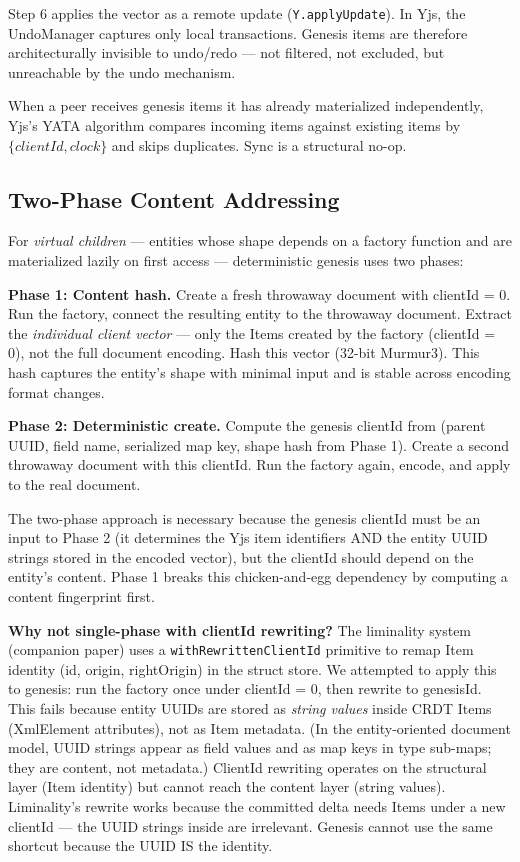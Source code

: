 Step 6 applies the vector as a remote update (\texttt{Y.applyUpdate}). In Yjs, the UndoManager captures only local transactions\cite{yata2016}. Genesis items are therefore architecturally invisible to undo/redo --- not filtered, not excluded, but unreachable by the undo mechanism.

When a peer receives genesis items it has already materialized independently, Yjs's YATA algorithm\cite{yata2016} compares incoming items against existing items by $\{\mathit{clientId}, \mathit{clock}\}$ and skips duplicates. Sync is a structural no-op.

\subsection{Two-Phase Content Addressing}

For \emph{virtual children} --- entities whose shape depends on a factory function and are materialized lazily on first access --- deterministic genesis uses two phases:

\textbf{Phase 1: Content hash.} Create a fresh throwaway document with clientId = 0. Run the factory, connect the resulting entity to the throwaway document. Extract the \emph{individual client vector} --- only the Items created by the factory (clientId = 0), not the full document encoding. Hash this vector (32-bit Murmur3). This hash captures the entity's shape with minimal input and is stable across encoding format changes.

\textbf{Phase 2: Deterministic create.} Compute the genesis clientId from (parent UUID, field name, serialized map key, shape hash from Phase 1). Create a second throwaway document with this clientId. Run the factory again, encode, and apply to the real document.

The two-phase approach is necessary because the genesis clientId must be an input to Phase 2 (it determines the Yjs item identifiers AND the entity UUID strings stored in the encoded vector), but the clientId should depend on the entity's content. Phase 1 breaks this chicken-and-egg dependency by computing a content fingerprint first.

\textbf{Why not single-phase with clientId rewriting?} The liminality system (companion paper\cite{plexus:liminal}) uses a \texttt{withRewrittenClientId} primitive to remap Item identity (id, origin, rightOrigin) in the struct store. We attempted to apply this to genesis: run the factory once under clientId = 0, then rewrite to genesisId. This fails because entity UUIDs are stored as \emph{string values} inside CRDT Items (XmlElement attributes), not as Item metadata. (In the entity-oriented document model\cite{plexus:arch}, UUID strings appear as field values and as map keys in type sub-maps; they are content, not metadata.) ClientId rewriting operates on the structural layer (Item identity) but cannot reach the content layer (string values). Liminality's rewrite works because the committed delta needs Items under a new clientId --- the UUID strings inside are irrelevant. Genesis cannot use the same shortcut because the UUID IS the identity.

